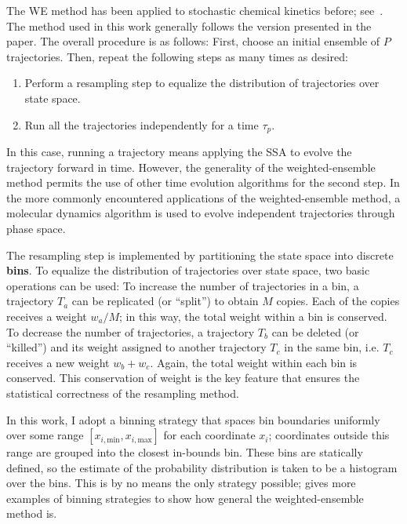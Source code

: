 \documentclass[english,letterpaper,12pt]{article}
\newcommand{\defkeywd}[1]{\textbf{#1}}
\begin{document}
\begin{doublespacing}
The WE method has been applied to stochastic chemical kinetics before; see~\cite{we-chemkin}. The method used in this work generally follows the version presented in the paper. The overall procedure is as follows: First, choose an initial ensemble of $P$ trajectories. Then, repeat the following steps as many times as desired:
\begin{enumerate}
    \item Perform a resampling step to equalize the distribution of trajectories over state space.
    \item Run all the trajectories independently for a time $\tau_p$.
\end{enumerate}
In this case, running a trajectory means applying the SSA to evolve the trajectory forward in time. However, the generality of the weighted-ensemble method permits the use of other time evolution algorithms for the second step. In the more commonly encountered applications of the weighted-ensemble method, a molecular dynamics algorithm is used to evolve independent trajectories through phase space.

The resampling step is implemented by partitioning the state space into discrete \defkeywd{bins}. To equalize the distribution of trajectories over state space, two basic operations can be used: To increase the number of trajectories in a bin, a trajectory $T_a$ can be replicated (or ``split'') to obtain $M$ copies. Each of the copies receives a weight $w_a/M$; in this way, the total weight within a bin is conserved. To decrease the number of trajectories, a trajectory $T_b$ can be deleted (or ``killed'') and its weight assigned to another trajectory $T_c$ in the same bin, i.e. $T_c$ receives a new weight $w_b + w_c$. Again, the total weight within each bin is conserved. This conservation of weight is the key feature that ensures the statistical correctness of the resampling method.

In this work, I adopt a binning strategy that spaces bin boundaries uniformly over some range $[x_{i,\text{min}}, x_{i,\text{max}}]$ for each coordinate $x_i$; coordinates outside this range are grouped into the closest in-bounds bin. These bins are statically defined, so the estimate of the probability distribution is taken to be a histogram over the bins. This is by no means the only strategy possible; \cite{we-exact} gives more examples of binning strategies to show how general the weighted-ensemble method is.



\end{doublespacing}
\end{document}
